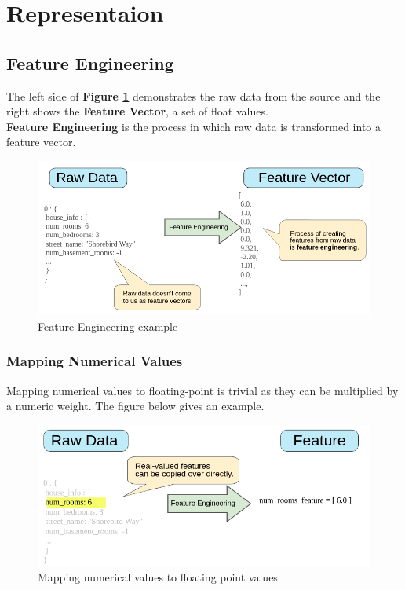 \documentclass[12pt]{article}
\begin{document}
\section{Representaion}
\subsection{Feature Engineering}
The left side of \textbf{Figure \ref{fig: raw to feature}} demonstrates the raw data from the source and the right shows the \textbf{Feature Vector}, a set of float values.
\\\textbf{Feature Engineering} is the process in which raw data is transformed into a feature vector.
\begin{figure}[h]
	\includegraphics[scale = 0.5]{imgs/RawToFeature.png}
	\centering
	\caption{Feature Engineering example}
	\label{fig: raw to feature}
\end{figure}

\subsubsection{Mapping Numerical Values}
Mapping numerical values to floating-point is trivial as they can be multiplied by a numeric weight. The figure below gives an example.
\begin{figure}[h]
	\includegraphics[scale = 0.5]{imgs/RawToIntFeature.png}
	\centering
	\caption{Mapping numerical values to floating point values}
\end{figure}
\end{document}
